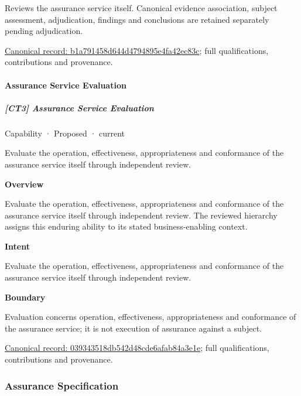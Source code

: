 Reviews the assurance service itself. Canonical evidence association, subject assessment, adjudication, findings and conclusions are retained separately pending adjudication.


{\footnotesize \href{../../../../continuum/strategy/capability/b1a791458d644d4794895e4fa42ec83c.md}{Canonical record: b1a791458d644d4794895e4fa42ec83c}; full qualifications, contributions and provenance.}\par
\paragraph{Assurance Service Evaluation}

\subparagraph{[CT3] Assurance Service Evaluation}

\label{element:039343518db542d48cde6afab84a3e1e}
{\small Capability · Proposed · current}\par

Evaluate the operation, effectiveness, appropriateness and conformance of the assurance service itself through independent review.



\textbf{Overview}



Evaluate the operation, effectiveness, appropriateness and conformance of the assurance service itself through independent review. The reviewed hierarchy assigns this enduring ability to its stated business-enabling context.



\textbf{Intent}



Evaluate the operation, effectiveness, appropriateness and conformance of the assurance service itself through independent review.



\textbf{Boundary}



Evaluation concerns operation, effectiveness, appropriateness and conformance of the assurance service; it is not execution of assurance against a subject.


{\footnotesize \href{../../../../continuum/strategy/capability/039343518db542d48cde6afab84a3e1e.md}{Canonical record: 039343518db542d48cde6afab84a3e1e}; full qualifications, contributions and provenance.}\par
\subsubsection{Assurance Specification}

